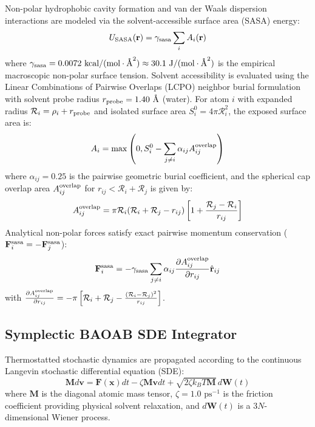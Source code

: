 \documentclass[journal=jpcbfk,manuscript=article]{achemso}
\begin{document}
Non-polar hydrophobic cavity formation and van der Waals dispersion interactions are modeled via the solvent-accessible surface area (SASA) energy:\cite{weiser1999approximate}
\begin{equation}
U_{\rm SASA}(\mathbf{r}) = \gamma_{\rm sasa} \sum_i A_i(\mathbf{r})
\end{equation}
where $\gamma_{\rm sasa} = 0.0072\text{ kcal}/(\text{mol}\cdot\text{\AA}^2) \approx 30.1\text{ J}/(\text{mol}\cdot\text{\AA}^2)$ is the empirical macroscopic non-polar surface tension. Solvent accessibility is evaluated using the Linear Combinations of Pairwise Overlaps (LCPO) neighbor burial formulation with solvent probe radius $r_{\rm probe} = 1.40\text{ \AA}$ (water). For atom $i$ with expanded radius $\mathcal{R}_i = \rho_i + r_{\rm probe}$ and isolated surface area $S_i^0 = 4\pi \mathcal{R}_i^2$, the exposed surface area is:
\begin{equation}
A_i = \max\left( 0, S_i^0 - \sum_{j \neq i} \alpha_{ij} A_{ij}^{\rm overlap} \right)
\end{equation}
where $\alpha_{ij} = 0.25$ is the pairwise geometric burial coefficient, and the spherical cap overlap area $A_{ij}^{\rm overlap}$ for $r_{ij} < \mathcal{R}_i + \mathcal{R}_j$ is given by:
\begin{equation}
A_{ij}^{\rm overlap} = \pi \mathcal{R}_i (\mathcal{R}_i + \mathcal{R}_j - r_{ij}) \left[ 1 + \frac{\mathcal{R}_j - \mathcal{R}_i}{r_{ij}} \right]
\end{equation}
Analytical non-polar forces satisfy exact pairwise momentum conservation ($\mathbf{F}_i^{\rm sasa} = - \mathbf{F}_j^{\rm sasa}$):
\begin{equation}
\mathbf{F}_i^{\rm sasa} = - \gamma_{\rm sasa} \sum_{j \neq i} \alpha_{ij} \frac{\partial A_{ij}^{\rm overlap}}{\partial r_{ij}} \hat{\mathbf{r}}_{ij}
\end{equation}
with $\frac{\partial A_{ij}^{\rm overlap}}{\partial r_{ij}} = - \pi \left[ \mathcal{R}_i + \mathcal{R}_j - \frac{(\mathcal{R}_i - \mathcal{R}_j)^2}{r_{ij}} \right]$.

\subsection{Symplectic BAOAB SDE Integrator}
Thermostatted stochastic dynamics are propagated according to the continuous Langevin stochastic differential equation (SDE):
\begin{equation}
\mathbf{M} d\mathbf{v} = \mathbf{F}(\mathbf{x}) dt - \zeta \mathbf{M} \mathbf{v} dt + \sqrt{2 \zeta k_B T \mathbf{M}} \, d\mathbf{W}(t)
\end{equation}
where $\mathbf{M}$ is the diagonal atomic mass tensor, $\zeta = 1.0\text{ ps}^{-1}$ is the friction coefficient providing physical solvent relaxation, and $d\mathbf{W}(t)$ is a $3N$-dimensional Wiener process. 
\end{document}
